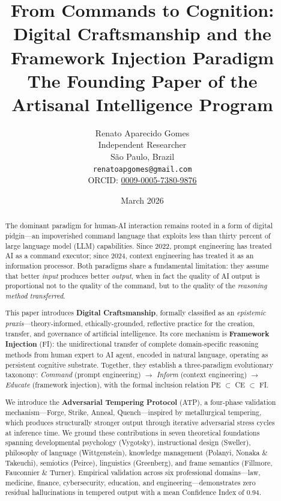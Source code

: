\documentclass[12pt,a4paper]{article}
\title{%
  \vspace{-1cm}
  \textbf{From Commands to Cognition:\\
  Digital Craftsmanship and the Framework Injection Paradigm}\\[0.5em]
  \large The Founding Paper of the Artisanal Intelligence Program
}
\author{
  Renato Aparecido Gomes\\
  Independent Researcher\\
  S\~{a}o Paulo, Brazil\\
  \texttt{renatoapgomes@gmail.com}\\
  ORCID: \href{https://orcid.org/0009-0005-7380-9876}{0009-0005-7380-9876}
}
\date{March 2026}
\begin{document}
\maketitle
\thispagestyle{empty}

\begin{abstract}
\noindent
The dominant paradigm for human-AI interaction remains rooted in a form of digital pidgin---an impoverished command language that exploits less than thirty percent of large language model (LLM) capabilities. Since 2022, prompt engineering has treated AI as a command executor; since 2024, context engineering has treated it as an information processor. Both paradigms share a fundamental limitation: they assume that better \emph{input} produces better \emph{output}, when in fact the quality of AI output is proportional not to the quality of the command, but to the quality of the \emph{reasoning method transferred}.

This paper introduces \textbf{Digital Craftsmanship}, formally classified as an \emph{epistemic praxis}---theory-informed, ethically-grounded, reflective practice for the creation, transfer, and governance of artificial intelligence. Its core mechanism is \textbf{Framework Injection} (FI): the unidirectional transfer of complete domain-specific reasoning methods from human expert to AI agent, encoded in natural language, operating as persistent cognitive substrate. Together, they establish a three-paradigm evolutionary taxonomy: \emph{Command} (prompt engineering) $\to$ \emph{Inform} (context engineering) $\to$ \emph{Educate} (framework injection), with the formal inclusion relation PE $\subset$ CE $\subset$ FI.

We introduce the \textbf{Adversarial Tempering Protocol} (ATP), a four-phase validation mechanism---Forge, Strike, Anneal, Quench---inspired by metallurgical tempering, which produces structurally stronger output through iterative adversarial stress cycles at inference time. We ground these contributions in seven theoretical foundations spanning developmental psychology (Vygotsky), instructional design (Sweller), philosophy of language (Wittgenstein), knowledge management (Polanyi, Nonaka \& Takeuchi), semiotics (Peirce), linguistics (Greenberg), and frame semantics (Fillmore, Fauconnier \& Turner). Empirical validation across six professional domains---law, medicine, finance, cybersecurity, education, and engineering---demonstrates zero residual hallucinations in tempered output with a mean Confidence Index of 0.94.


\end{abstract}
\end{document}
